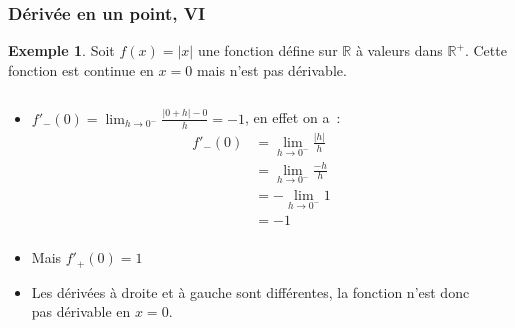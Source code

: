 \documentclass[10pt,notheorems]{beamer}
\theoremstyle{plain}
\theoremstyle{definition} %
\newtheorem{example}{Exemple}
\begin{document}
\begin{frame}
  \frametitle{Dérivée en un point, VI}
  \hypertarget{slide_derivee_6}{}

  \begin{example}
    Soit $f(x) = |x|$ une fonction défine sur $\mathbb R$ à valeurs dans $\mathbb R^+$. Cette fonction est continue en $x=0$ mais n'est pas dérivable.\newline

    \begin{columns}[onlytextwidth]
      \begin{column}{.5\textwidth}
        {\small
          \begin{itemize}
          \item $f'_-(0)=\lim_{h\rightarrow 0^-} \frac{|0+h|-0}{h} = -1$, en effet on a~:
            \[
              \begin{split}
                f'_-(0) &= \lim_{h\rightarrow 0^-} \frac{|h|}{h}\\
                &= \lim_{h\rightarrow 0^-} \frac{-h}{h}\\
                &= -\lim_{h\rightarrow 0^-} 1\\
                &= -1\\
              \end{split}
            \]
          \item Mais $f'_+(0) = 1$

          \item Les dérivées à droite et à gauche sont différentes, la fonction n'est donc pas dérivable en $x=0$.
          \end{itemize}}
      \end{column}
      \begin{column}{.5\textwidth}
      \end{column}
    \end{columns}
  \end{example}

\end{frame}
\end{document}
